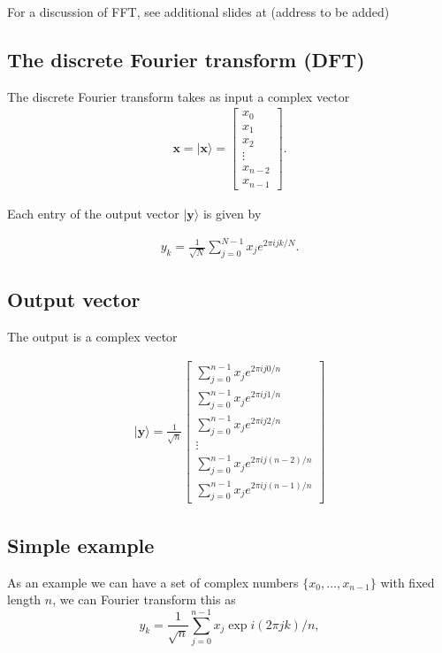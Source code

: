 \documentclass[%
oneside,                 %
final,                   %
10pt]{article}
\begin{document}
For a discussion of FFT, see additional slides at (address to be added)

\subsection{The discrete Fourier transform (DFT)}

The discrete Fourier transform takes as input a complex vector
\begin{align*}
\bm{x} =\vert\bm{x}\rangle= 
\begin{bmatrix}
x_0 \\ 
x_1 \\ 
x_2 \\
\vdots \\ 
x_{n-2} \\
x_{n-1}
\end{bmatrix}.
\end{align*}

Each entry of the output vector $\vert \bm{y}\rangle$ is given by

\begin{align*}
y_k = \frac{1}{\sqrt{N}} \sum_{j=0}^{N-1} x_je^{2 \pi ijk/N}.
\end{align*}

\subsection{Output vector}

The output is a complex vector

\begin{align*}
\vert \bm{y}\rangle = 
\frac{1}{\sqrt{n}}
\begin{bmatrix}
\sum_{j=0}^{n-1} x_je^{2\pi ij0/n} \\
\sum_{j=0}^{n-1} x_je^{2\pi ij1/n} \\
\sum_{j=0}^{n-1} x_je^{2\pi ij2/n} \\
\vdots \\
\sum_{j=0}^{n-1} x_je^{2\pi ij(n-2)/n} \\
\sum_{j=0}^{n-1} x_je^{2\pi ij(n-1)/n}
\end{bmatrix}
\end{align*}

\subsection{Simple example}

As an example we can have a set of complex numbers
$\{x_0,\dots,x_{n-1}\}$ with fixed length $n$, we can Fourier
transform this as
\[
y_k = \frac{1}{\sqrt{n}} \sum_{j=0}^{n-1} x_j \exp{i(2\pi jk)/n},
\]
\end{document}
